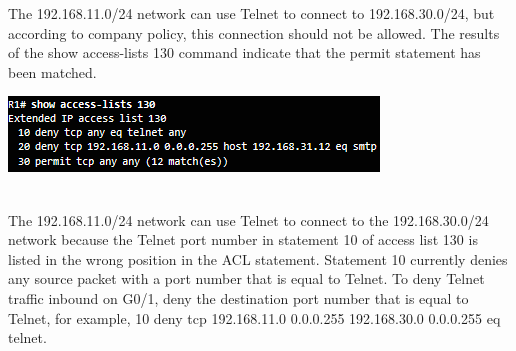 \begin{example}
The 192.168.11.0/24 network can use Telnet to connect to 192.168.30.0/24, but according to company policy, this connection should not be allowed. The results of the show access-lists 130 command indicate that the permit statement has been matched.\\
\begin{listing}
\includegraphics[scale=1]{pictures/example3.PNG} 
\end{listing}\\
The 192.168.11.0/24 network can use Telnet to connect to the 192.168.30.0/24 network because the Telnet port number in statement 10 of access list 130 is listed in the wrong position in the ACL statement. Statement 10 currently denies any source packet with a port number that is equal to Telnet. To deny Telnet traffic inbound on G0/1, deny the destination port number that is equal to Telnet, for example, 10 deny tcp 192.168.11.0 0.0.0.255 192.168.30.0 0.0.0.255 eq telnet.
\end{example}